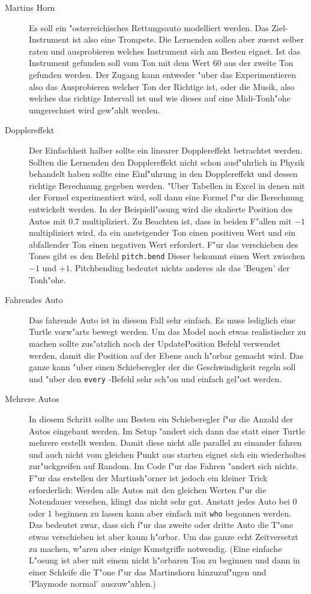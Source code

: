 \begin{description}
\item[Martins Horn] Es soll ein "osterreichisches Rettungsauto modelliert werden.
Das Ziel-Instrument ist also eine Trompete. Die Lernenden sollen aber zuerst
selber raten und ausprobieren welches Instrument sich am Besten eignet. 
Ist das Instrument gefunden soll vom Ton mit dem Wert 60 aus der zweite Ton 
gefunden werden. Der Zugang kann entweder "uber das Experimentieren also das
Ausprobieren welcher Ton der Richtige ist, oder die Musik, also welches das 
richtige Intervall ist und wie dieses auf eine Midi-Tonh"ohe umgerechnet wird
gew"ahlt werden. 

\item[Dopplereffekt] Der Einfachheit halber sollte ein linearer Dopplereffekt
betrachtet werden. Sollten die Lernenden den Dopplereffekt nicht schon ausf"uhrlich
in Physik behandelt haben sollte eine Einf"uhrung in den Dopplereffekt und dessen
richtige Berechnung gegeben werden. "Uber Tabellen in Excel in denen mit der
Formel experimentiert wird, soll dann eine Formel f"ur die Berechnung entwickelt
werden. In der Beispiell"osung wird die skalierte Position des Autos mit $0.7$ 
multipliziert. Zu Beachten ist, dass in beiden F"allen mit $-1$ multipliziert wird,
da ein ansteigender Ton einen positiven Wert und ein abfallender Ton einen negativen
Wert erfordert. F"ur das verschieben des Tones gibt es den Befehl \lstinline|pitch.bend|
Dieser bekommt einen Wert zwischen $-1$ und $+1$. Pitchbending bedeutet nichts
anderes als das 'Beugen' der Tonh"ohe. 

\item[Fahrendes Auto] Das fahrende Auto ist in diesem Fall sehr einfach. Es muss
lediglich eine Turtle vorw"arts bewegt werden. Um das Model noch etwas realistischer
zu machen sollte zus"atzlich noch der UpdatePosition Befehl verwendet werden, damit
die Position auf der Ebene auch h"orbar gemacht wird. Das ganze kann "uber einen
Schieberegler der die Geschwindigkeit regeln soll und "uber den \lstinline|every|
-Befehl sehr sch"on und einfach gel"ost werden.

\item[Mehrere Autos] In diesem Schritt sollte am Besten ein Schieberegler f"ur
die Anzahl der Autos eingebaut werden. Im Setup "andert sich dann das statt
einer Turtle mehrere erstellt werden. Damit diese nicht alle parallel zu
einander fahren und auch nicht vom gleichen Punkt aus starten eignet sich
ein wiederholtes zur"uckgreifen auf Random. Im Code f"ur das Fahren "andert
sich nichts. F"ur das erstellen der Martinsh"orner ist jedoch ein kleiner
Trick erforderlich: Werden alle Autos mit den gleichen Werten f"ur die 
Notendauer versehen, klingt das nicht sehr gut. Anstatt jedes Auto bei 0 oder 1
beginnen zu lassen kann aber einfach mit \lstinline|who| begonnen werden. Das
bedeutet zwar, dass sich f"ur das zweite oder dritte Auto die T"one etwas
verschieben ist aber kaum h"orbar. Um das ganze echt Zeitversetzt zu machen,
w"aren aber einige Kunstgriffe notwendig. (Eine einfache L"osung ist aber
mit einem nicht h"orbaren Ton zu beginnen und dann in einer Schleife die T"one
f"ur das Martinshorn hinzuzuf"ugen und 'Playmode normal' auszuw"ahlen.)



\end{description}
